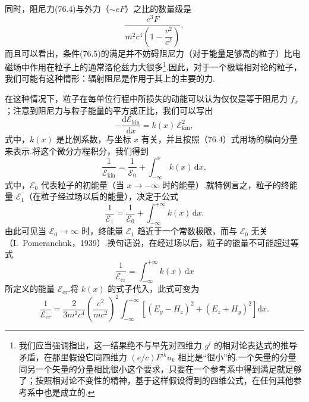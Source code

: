 同时，阻尼力(76.4)与外力（$\sim eF$）之比的数量级是
\begin{equation*}
  \frac{e^3F}{m^2c^4\left(1-\dfrac{v^2}{c^2}\right)},
\end{equation*}
而且可以看出，条件(76.5)的满足并不妨碍阻尼力（对于能量足够高的粒子）比电磁场中作用在粒子上的通常洛伦兹力大很多\footnote{我们应当强调指出，这一结果绝不与早先对四维力 $g^i$ 的相对论表达式的推导矛盾，在那里假设它同四维力 $(e/c)F^{ik}u_k$ 相比是“很小”的.一个矢量的分量同另一个矢量的分量相比很小这个要求，只要在一个参考系中得到满足就足够了；按照相对论不变性的精神，基于这样假设得到的四维公式，在任何其他参考系中也是成立的.}.因此，对于一个极端相对论的粒子，我们可能有这种情形：辐射阻尼是作用于其上的主要的力.

在这种情况下，粒子在每单位行程中所损失的动能可以认为仅仅是等于阻尼力 $f_x$；注意到阻尼力与粒子能量的平方成正比，我们可以写出
\begin{equation*}
  -\frac{\mathrm{d}\mathcal{E}_{\mathrm{kin}}}{\mathrm{d}x}=k(x)\,\mathcal{E}_{\mathrm{kin}}^2,
\end{equation*}
式中，$k(x)$ 是比例系数，与坐标 $x$ 有关，并且按照（76.4）式用场的横向分量来表示.将这个微分方程积分，我们得到
\begin{equation*}
  \frac{1}{\mathcal{E}_{\mathrm{kin}}}=\frac{1}{\mathcal{E}_0}
  +\int_{-\infty}^{x}k(x)\,\mathrm{d}x,
\end{equation*}
式中，$\mathcal{E}_0$ 代表粒子的初能量（当 $x\to-\infty$ 时的能量）.就特例言之，粒子的终能量 $\mathcal{E}_1$（在粒子经过场以后的能量），决定于公式
\begin{equation*}
  \frac{1}{\mathcal{E}_1}=\frac{1}{\mathcal{E}_0}
  +\int_{-\infty}^{+\infty}k(x)\,\mathrm{d}x.
\end{equation*}
由此可见当 $\mathcal{E}_0\to\infty$ 时，终能量 $\mathcal{E}_1$ 趋近于一个常数极限，而与 $\mathcal{E}_0$ 无关（I.~Pomeranchuk，1939）.换句话说，在经过场以后，粒子的能量不可能超过等式
\begin{equation*}
  \frac{1}{\mathcal{E}_{\mathrm{cr}}}
  =\int_{-\infty}^{+\infty}k(x)\,\mathrm{d}x
\end{equation*}
所定义的能量 $\mathcal{E}_{\mathrm{cr}}$.将 $k(x)$ 的式子代入，此式可变为
\begin{equation}
  \frac{1}{\mathcal{E}_{\mathrm{cr}}}
  =\frac{2}{3m^2c^4}\left(\frac{e^2}{mc^2}\right)^{\!2}
  \int_{-\infty}^{+\infty}\left[(E_y-H_z)^2+(E_z+H_y)^2\right]\mathrm{d}x.
\end{equation}


